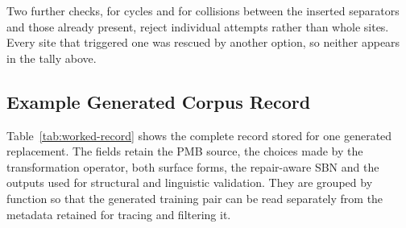 Two further checks, for cycles and for collisions between the inserted
separators and those already present, reject individual attempts rather than
whole sites. Every site that triggered one was rescued by another option, so
neither appears in the tally above.

\subsection{Example Generated Corpus Record}
\label{app:generated-record}

Table~\ref{tab:worked-record} shows the complete record stored for one
generated replacement. The fields retain the PMB source, the choices made by
the transformation operator, both surface forms, the repair-aware SBN and the
outputs used for structural and linguistic validation. They are grouped by
function so that the generated training pair can be read separately from the
metadata retained for tracing and filtering it.

